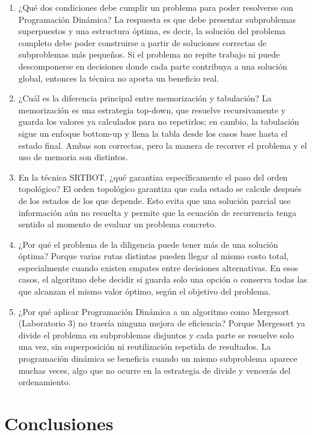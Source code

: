 \documentclass{article}
\begin{document}
\begin{enumerate}
    \item ¿Qué dos condiciones debe cumplir un problema para poder resolverse con Programación Dinámica? La respuesta es que debe presentar subproblemas superpuestos y una estructura óptima, es decir, la solución del problema completo debe poder construirse a partir de soluciones correctas de subproblemas más pequeños. Si el problema no repite trabajo ni puede descomponerse en decisiones donde cada parte contribuya a una solución global, entonces la técnica no aporta un beneficio real.
    \item ¿Cuál es la diferencia principal entre memorización y tabulación? La memorización es una estrategia top-down, que resuelve recursivamente y guarda los valores ya calculados para no repetirlos; en cambio, la tabulación sigue un enfoque bottom-up y llena la tabla desde los casos base hasta el estado final. Ambas son correctas, pero la manera de recorrer el problema y el uso de memoria son distintos.
    \item En la técnica SRTBOT, ¿qué garantiza específicamente el paso del orden topológico? El orden topológico garantiza que cada estado se calcule después de los estados de los que depende. Esto evita que una solución parcial use información aún no resuelta y permite que la ecuación de recurrencia tenga sentido al momento de evaluar un problema concreto.
    \item ¿Por qué el problema de la diligencia puede tener más de una solución óptima? Porque varias rutas distintas pueden llegar al mismo costo total, especialmente cuando existen empates entre decisiones alternativas. En esos casos, el algoritmo debe decidir si guarda solo una opción o conserva todas las que alcanzan el mismo valor óptimo, según el objetivo del problema.
    \item ¿Por qué aplicar Programación Dinámica a un algoritmo como Mergesort (Laboratorio 3) no traería ninguna mejora de eficiencia? Porque Mergesort ya divide el problema en subproblemas disjuntos y cada parte se resuelve solo una vez, sin superposición ni reutilización repetida de resultados. La programación dinámica se beneficia cuando un mismo subproblema aparece muchas veces, algo que no ocurre en la estrategia de divide y vencerás del ordenamiento.
\end{enumerate}

\section{Conclusiones}
\end{document}
